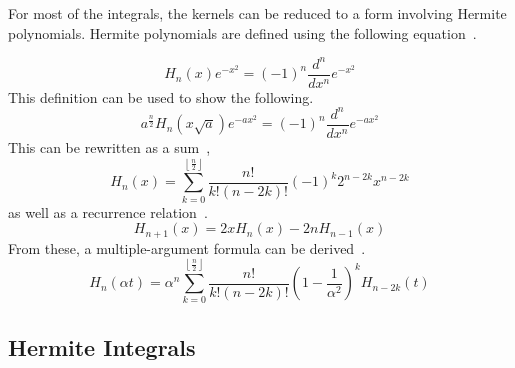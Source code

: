For most of the integrals, the kernels can be reduced to a form involving Hermite polynomials. Hermite polynomials are defined using the following equation~\cite{wolfram-hermite}.

\begin{equation}
  H_n(x) e^{-x^2} = (-1)^n\frac{d^n}{dx^n} e^{-x^2}
  \label{herm-def}
\end{equation}
This definition can be used to show the following.
\begin{equation}
  a^{\frac{n}{2}} H_n\left(x\sqrt{a}\right) e^{-ax^2} = (-1)^n \frac{d^n}{dx^n} e^{-ax^2}
  \label{herm-mult-def}
\end{equation}
This can be rewritten as a sum~\cite{wolfram-hermite},
\begin{equation}
  H_n(x) = \sum_{k = 0}^{\left\lfloor\frac{n}{2}\right\rfloor} \frac{n!}{k!(n - 2k)!}(-1)^k 2^{n - 2k} x^{n - 2k}
  \label{herm-sum}
\end{equation}
as well as a recurrence relation~\cite{wolfram-hermite}.
\begin{equation}
  H_{n + 1}(x) = 2xH_{n}(x) - 2nH_{n - 1}(x)
  \label{herm-recur}
\end{equation}
From these, a multiple-argument formula can be derived~\cite{wolfram-hermite}.
\begin{equation}
  H_n(\alpha t) = \alpha^n \sum_{k = 0}^{\left\lfloor\frac{n}{2}\right\rfloor}\frac{n!}{k!(n - 2k)!}\left(1 - \frac{1}{\alpha^2}\right)^k H_{n - 2k}(t)
  \label{herm-maf}
\end{equation}

\subsection{Hermite Integrals}


